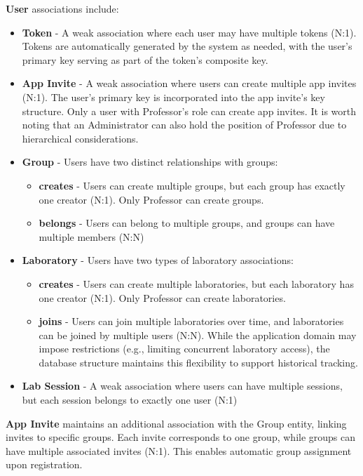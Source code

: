 \documentclass[a4paper,twoside,11pt]{article}
\begin{document}
\textbf{User} associations include:
\begin{itemize}
    \item \textbf{Token} - A weak association where each user may have multiple tokens (N:1). Tokens are automatically generated by the system as needed, with the user's primary key serving as part of the token's composite key.
    \item \textbf{App Invite} - A weak association where users can create multiple app invites (N:1). The user's primary key is incorporated into the app invite's key structure. Only a user with Professor's role can create app invites. 
    It is worth noting that an Administrator can also hold the position of Professor due to hierarchical considerations.    \item \textbf{Group} - Users have two distinct relationships with groups:
    \begin{itemize}
        \item \textbf{creates} - Users can create multiple groups, but each group has exactly one creator (N:1). Only Professor can create groups.
        \item \textbf{belongs} - Users can belong to multiple groups, and groups can have multiple members (N:N)
    \end{itemize}
    \item \textbf{Laboratory} - Users have two types of laboratory associations:
    \begin{itemize}
        \item \textbf{creates} - Users can create multiple laboratories, but each laboratory has one creator (N:1). Only Professor can create laboratories.
        \item \textbf{joins} - Users can join multiple laboratories over time, and laboratories can be joined by multiple users (N:N). While the application domain may impose restrictions (e.g., limiting concurrent laboratory access), the database structure maintains this flexibility to support historical tracking.
    \end{itemize}
    \item \textbf{Lab Session} - A weak association where users can have multiple sessions, but each session belongs to exactly one user (N:1)
\end{itemize}

\textbf{App Invite} maintains an additional association with the Group entity, linking invites to specific groups. Each invite corresponds to one group, while groups can have multiple associated invites (N:1). This enables automatic group assignment upon registration.
\end{document}

